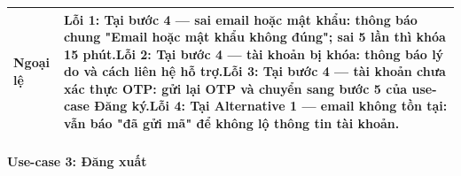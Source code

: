 \begin{longtable}{|p{3.2cm}|p{\dimexpr\linewidth-3.2cm-4\tabcolsep-3\arrayrulewidth\relax}|}
\textbf{Ngoại lệ} & \textbf{Lỗi 1:} Tại bước 4 --- sai email hoặc mật khẩu: thông báo chung "Email hoặc mật khẩu không đúng"; sai 5 lần thì khóa 15 phút.\newline \textbf{Lỗi 2:} Tại bước 4 --- tài khoản bị khóa: thông báo lý do và cách liên hệ hỗ trợ.\newline \textbf{Lỗi 3:} Tại bước 4 --- tài khoản chưa xác thực OTP: gửi lại OTP và chuyển sang bước 5 của use-case Đăng ký.\newline \textbf{Lỗi 4:} Tại Alternative 1 --- email không tồn tại: vẫn báo "đã gửi mã" để không lộ thông tin tài khoản. \\ \hline
\end{longtable}
\endgroup


\paragraph{Use-case 3: Đăng xuất}

